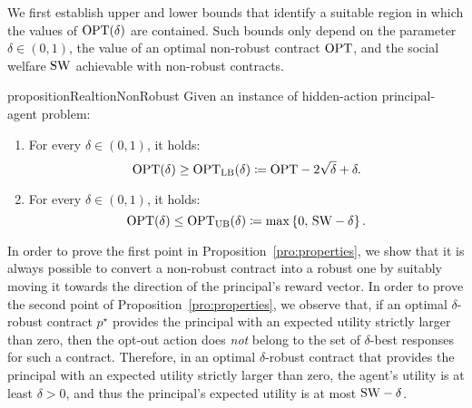 We first establish upper and lower bounds that identify a suitable region in which the values of $\textnormal{OPT}(\delta)$ are contained.
%
Such bounds only depend on the parameter $\delta \in (0,1)$, the value of an optimal non-robust contract $\textnormal{OPT}$, and the social welfare $\textnormal{SW}$ achievable with non-robust contracts.
%
\begin{restatable}{proposition}{RealtionNonRobust}\label{pro:properties}
	Given an instance of hidden-action principal-agent problem:
	\begin{enumerate}
		\item For every $\delta \in (0,1)$, it holds:
		\begin{equation*}
			\textnormal{OPT}(\delta) \ge \textnormal{OPT}_{\textnormal{LB}}(\delta) \coloneqq \textnormal{OPT} - 2 \sqrt{\delta} + \delta .
		\end{equation*}
		\item For every $\delta \in (0,1)$, it holds:
		\begin{equation*}
			\textnormal{OPT}(\delta)\le \textnormal{OPT}_{\textnormal{UB}}(\delta) \coloneqq \max\left\{0, \, \textnormal{SW} - \delta \right\}. 
		\end{equation*}
	\end{enumerate}
\end{restatable}
%
In order to prove the first point in Proposition~\ref{pro:properties}, we show that it is always possible to convert a non-robust contract into a robust one by suitably moving it towards the direction of the principal's reward vector.
%
In order to prove the second point of Proposition~\ref{pro:properties}, we observe that, if an optimal $\delta$-robust contract $p^\star$ provides the principal with an expected utility strictly larger than zero, then the opt-out action does \emph{not} belong to the set of $\delta$-best responses for such a contract.
%
Therefore, in an optimal $\delta$-robust contract that provides the principal with an expected utility strictly larger than zero, the agent's utility is at least $\delta > 0$, and thus the principal's expected utility is at most $\textnormal{SW} - \delta$.
%
%

